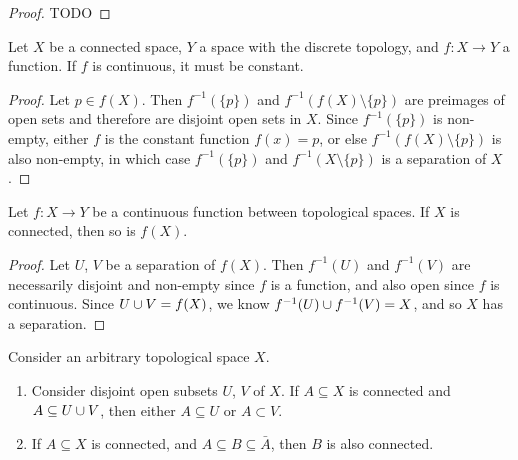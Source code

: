 \begin{proof}
    {\color{red}TODO}
\end{proof}

\begin{prop}
    Let $X$ be a connected space, $Y$ a space with the discrete topology, and $f: X \to Y$ a function. If $f$ is continuous, it must be constant.
\end{prop}

\begin{proof}
    Let $p \in f(X)$. Then $f^{-1}(\{p\})$ and $f^{-1}(f(X)\setminus \{p\})$ are preimages of open sets and therefore are disjoint open sets in $X$. Since $f^{-1}(\{p\})$ is non-empty, either $f$ is the constant function $f(x) = p$, or else $f^{-1}(f(X)\setminus \{p\})$ is also non-empty, in which case $f^{-1}(\{p\})$ and $f^{-1}(X\setminus\{p\})$ is a separation of $X$.
\end{proof}

\begin{prop}\label{prop:continuous-image-connectedness}
    Let $f: X \to Y$ be a continuous function between topological spaces. If $X$ is connected, then so is $f(X)$.
\end{prop}

\begin{proof}
    Let $U$, $V$ be a separation of $f(X)$. Then $f^{-1}(U)$ and $f^{-1}(V)$ are necessarily disjoint and non-empty since $f$ is a function, and also open since $f$ is continuous. Since $U \cup V = f(X)$, we know $f^{-1}(U) \cup f^{-1}(V) = X$, and so $X$ has a separation.
\end{proof}

\begin{thm}\label{thm:connected-tools}
    Consider an arbitrary topological space $X$.

    \begin{enumerate}[label=(\arabic*)]
        \item Consider disjoint open subsets $U$, $V$ of $X$. If $A \subseteq X$ is connected and $A \subseteq U \cup V$, then either $A \subseteq U$ or $A \subset V$.
        \item If $A \subseteq X$ is connected, and $A \subseteq B \subseteq \bar{A}$, then $B$ is also connected.
    \end{enumerate}
\end{thm}

